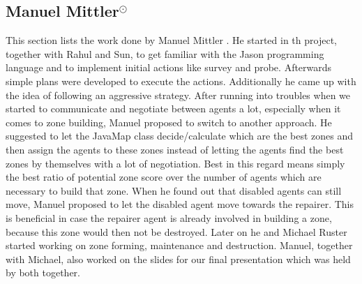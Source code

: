\subsection[Manuel Mittler]{Manuel Mittler$^{\odot}$}
This section lists the work done by Manuel Mittler .
He started in th project, together with Rahul and Sun, to get familiar with the Jason programming language and to implement initial actions like survey and probe. Afterwards simple plans were developed to execute the actions. Additionally he came up with the idea of following an aggressive strategy. After running into troubles when we started to communicate and negotiate between agents a lot, especially when it comes to zone building, Manuel proposed to switch to another approach. He suggested to let the JavaMap class decide/calculate which are the best zones and then assign the agents to these zones instead of letting the agents find the best zones by themselves with a lot of negotiation. Best in this regard means simply the best ratio of potential zone score over the number of agents which are necessary to build that zone. When he found out that disabled agents can still move, Manuel proposed to let the disabled agent move towards the repairer. This is beneficial in case the repairer agent is already involved in building a zone, because this zone would then not be destroyed. Later on he and Michael Ruster started working on zone forming, maintenance and destruction.
Manuel, together with Michael, also worked on the slides for our final presentation which was held by both together.
